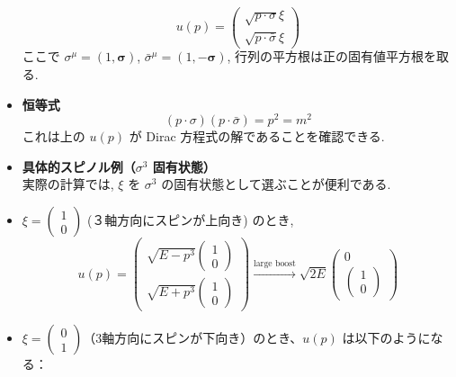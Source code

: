 \documentclass[a4paper,12pt]{article}
\begin{document}
\begin{itemize}
\begin{equation*}
    u(p) =  \begin{pmatrix}
      \sqrt{p \cdot \sigma}\xi \\
      \sqrt{p \cdot \bar{\sigma}}\xi
    \end{pmatrix} \tag{3.50}
  \end{equation*}
  ここで $\sigma^\mu = (1, \boldsymbol{\sigma})$, $\bar{\sigma}^\mu = (1, -\boldsymbol{\sigma})$, 行列の平方根は正の固有値平方根を取る.
  \item \textbf{恒等式}  
  \begin{equation*}
    (p \cdot \sigma)(p \cdot \bar{\sigma}) = p^2 = m^2 \tag{3.51}
  \end{equation*}
  これは上の $u(p)$ が Dirac 方程式の解であることを確認できる.

  \item \textbf{具体的スピノル例（$\sigma^3$ 固有状態）}\\
  実際の計算では, $\xi$ を $\sigma^3$ の固有状態として選ぶことが便利である.
  \item $\xi = \begin{pmatrix} 1 \\ 0 \end{pmatrix}$ (３軸方向にスピンが上向き) のとき,
  \begin{equation*}
    u(p) =
    \begin{pmatrix}
    \sqrt{E - p^3} \begin{pmatrix} 1 \\ 0 \end{pmatrix} \\
    \sqrt{E + p^3} \begin{pmatrix} 1 \\ 0 \end{pmatrix}
    \end{pmatrix}
    \xrightarrow{\text{large boost}}
    \sqrt{2E}
    \begin{pmatrix}
    0 \\
    \begin{pmatrix} 1 \\ 0 \end{pmatrix}
    \end{pmatrix} \label{3.52}\tag{3.52}
  \end{equation*}
  \item $\xi = \begin{pmatrix} 0 \\ 1 \end{pmatrix}$（3軸方向にスピンが下向き）のとき、$u(p)$ は以下のようになる：
  \begin{equation*}

\end{equation*}
\end{itemize}
\end{document}
